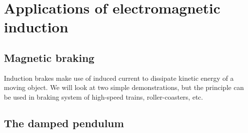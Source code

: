 \documentclass[a4paper,12pt]{book}
\newcounter{question}[chapter]
\renewcommand{\thequestion}{\arabic{chapter}.\arabic{question}}
\newcommand{\question}[1]{%
	\refstepcounter{question}
	\noindent{\textcolor{magenta}{\textsf{\textbf{Question \thequestion }}} \hspace*{1pt} #1 %
}}
\renewenvironment{marginfigure}[1][]{\begin{figure}[htbp]\centering}{\end{figure}}
\begin{document}
		
		
		



\section{Applications of electromagnetic induction}

\subsection{Magnetic braking}

Induction brakes make use of induced current to dissipate kinetic energy of a moving object. We will look at two simple demonstrations, but the principle can be used in braking system of high-speed trains, roller-coasters, etc.

\subsection*{The damped pendulum}
\end{document}
